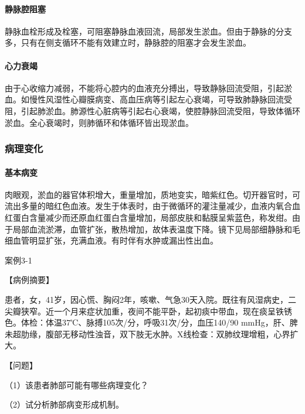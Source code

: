 \paragraph{静脉腔阻塞}
静脉血栓形成及栓塞，可阻塞静脉血液回流，局部发生淤血。但由于静脉的分支多，只有在侧支循环不能有效建立时，静脉腔的阻塞才会发生淤血。

\paragraph{心力衰竭}
由于心收缩力减弱，不能将心腔内的血液充分搏出，导致静脉回流受阻，引起淤血。如慢性风湿性心瓣膜病变、高血压病等引起左心衰竭，可导致肺静脉回流受阻，引起肺淤血。肺源性心脏病等引起右心衰竭，使腔静脉回流受阻，导致体循环淤血。全心衰竭时，则肺循环和体循环皆出现淤血。

\subsubsection{病理变化}

\paragraph{基本病变}
肉眼观，淤血的器官体积增大，重量增加，质地变实，暗紫红色。切开器官时，可流出多量的暗红色血液。发生于体表时，由于微循环的灌注量减少，血液内氧合血红蛋白含量减少而还原血红蛋白含量增加，局部皮肤和黏膜呈紫蓝色，称发绀。由于局部血流淤滞，血管扩张，散热增加，故体表温度下降。镜下见局部细静脉和毛细血管明显扩张，充满血液。有时伴有水肿或漏出性出血。
\begin{framed}
  {案例3-1}

  {【病例摘要】}

  患者，女，41岁，因心慌、胸闷2年，咳嗽、气急30天入院。既往有风湿病史，二尖瓣狭窄。近一个月来症状加重，夜间不能平卧，起初痰中带血，现在痰呈铁锈色。体检：体温37℃、脉搏105次/分，呼吸31次/分，血压140/90
  mmHg，肝、脾未超肋缘，腹部无移动性浊音，双下肢无水肿。X线检查：双肺纹理增粗，心界扩大。

  {【问题】}

  （1）该患者肺部可能有哪些病理变化？

  （2）试分析肺部病变形成机制。
\end{framed}

